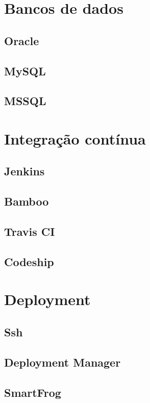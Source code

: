 

    \section{Bancos de dados}

	\subsection{Oracle}
	\subsection{MySQL}
	\subsection{MSSQL}


    \section{Integração contínua}

	\subsection{Jenkins}
	\subsection{Bamboo}
	\subsection{Travis CI}
	\subsection{Codeship}

    \section{Deployment}

	\subsection{Ssh}
	\subsection{Deployment Manager}
	\subsection{SmartFrog}
